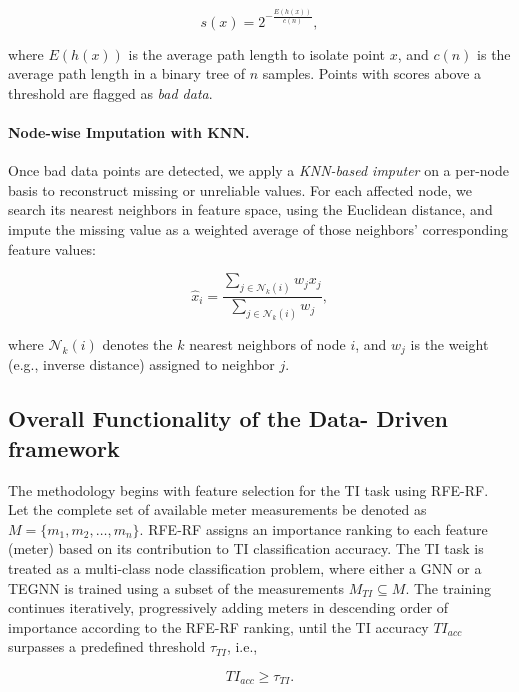\documentclass[journal]{IEEEtran}  %
\begin{document}
\begin{equation}
\label{IF anomaly score}
s(x) = 2^{-\frac{E(h(x))}{c(n)}},
\end{equation}

where \( E(h(x)) \) is the average path length to isolate point \( x \), and \( c(n) \) is the average path length in a binary tree of \( n \) samples. Points with scores above a threshold are flagged as \textit{bad data}.

\paragraph{Node-wise Imputation with KNN.}
Once bad data points are detected, we apply a \textit{KNN-based imputer} on a per-node basis to reconstruct missing or unreliable values. For each affected node, we search its nearest neighbors in feature space, using the Euclidean distance, and impute the missing value as a weighted average of those neighbors’ corresponding feature values:

\begin{equation}
\label{IF anomaly score}
\hat{x}_i = \frac{\sum_{j \in \mathcal{N}_k(i)} w_j x_j}{\sum_{j \in \mathcal{N}_k(i)} w_j},
\end{equation}

where \( \mathcal{N}_k(i) \) denotes the \( k \) nearest neighbors of node \( i \), and \( w_j \) is the weight (e.g., inverse distance) assigned to neighbor \( j \).


\subsection{Overall Functionality of the Data- Driven framework}

The methodology begins with feature selection for the TI task using RFE-RF. Let the complete set of available meter measurements be denoted as \( M = \{m_1, m_2, \dots, m_n\} \). RFE-RF assigns an importance ranking to each feature (meter) based on its contribution to TI classification accuracy. The TI task is treated as a multi-class node classification problem, where either a GNN or a TEGNN is trained using a subset of the measurements \( M_{TI} \subseteq M \). The training continues iteratively, progressively adding meters in descending order of importance according to the RFE-RF ranking, until the TI accuracy \( TI_{acc} \) surpasses a predefined threshold \(\tau_{TI}\), i.e.,

\begin{equation}
\label{TI_acc}
TI_{acc} \geq \tau_{TI}.
\end{equation}
\end{document}
